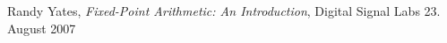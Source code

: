 \documentclass[12pt,a4paper]{article}
\begin{document}





%
%
%
%
\renewcommand{\refname}{\normalfont\selectfont\normalsize Kildeliste} 
\begin{thebibliography}{9}

   Randy Yates,
  \emph{Fixed-Point Arithmetic: An Introduction},
   Digital Signal Labs
  23. August
  2007

\end{thebibliography}
\end{document}
